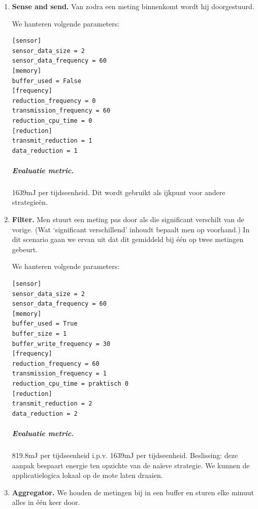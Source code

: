 \documentclass[11pt]{article}
\begin{document}


\begin{enumerate}
\item \textbf{Sense and send.} Van zodra een meting binnenkomt wordt hij doorgestuurd.

We hanteren volgende parameters: 

\begin{verbatim}
[sensor]
sensor_data_size = 2
sensor_data_frequency = 60
[memory]
buffer_used = False
[frequency]
reduction_frequency = 0
transmission_frequency = 60
reduction_cpu_time = 0
[reduction]
transmit_reduction = 1
data_reduction = 1
\end{verbatim}

\subparagraph{Evaluatie metric.} 1639mJ per tijdseenheid. Dit wordt gebruikt als ijkpunt voor andere strategie\"en.

\item \textbf{Filter.} Men stuurt een meting pas door als die significant verschilt
van de vorige. (Wat `significant verschillend' inhoudt bepaalt men op voorhand.)
In dit scenario gaan we ervan uit dat dit gemiddeld bij \'e\'en op twee metingen
gebeurt.

We hanteren volgende parameters:
\begin{verbatim}
[sensor]
sensor_data_size = 2
sensor_data_frequency = 60
[memory]
buffer_used = True
buffer_size = 1
buffer_write_frequency = 30
[frequency]
reduction_frequency = 60
transmission_frequency = 1
reduction_cpu_time = praktisch 0
[reduction]
transmit_reduction = 2
data_reduction = 2
\end{verbatim} 
\subparagraph{Evaluatie metric.} 819.8mJ per tijdseenheid i.p.v.
1639mJ per tijdseenheid. Beslissing: deze aanpak bespaart energie ten opzichte
van de na\"ieve strategie. We kunnen de applicatielogica lokaal op de mote laten
draaien.

\item \textbf{Aggregator.} We houden de metingen bij in een buffer en sturen elke
minuut alles in \'e\'en keer door.


\end{enumerate}
\end{document}
